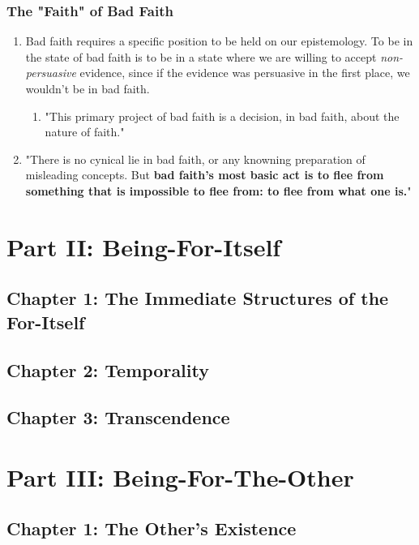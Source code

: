 \subsubsection{The "Faith" of Bad Faith}

\begin{enumerate}
  \item Bad faith requires a specific position to be held on our epistemology. To be in the state of bad faith is to be in a state where we are willing to accept \emph{non-persuasive} evidence, since if the evidence was persuasive in the first place, we wouldn't be in bad faith.
  \begin{enumerate}
    \item "This primary project of bad faith is a decision, in bad faith, about the nature of faith." \autocite[114]{sartre}
  \end{enumerate}
  \item "There is no cynical lie in bad faith, or any knowning preparation of misleading concepts. But \textbf{bad faith's most basic act is to flee from something that is impossible to flee from: to flee from what one is.}" \autocite[117]{sartre}
\end{enumerate}

\section{Part II: Being-For-Itself}

\subsection{Chapter 1: The Immediate Structures of the For-Itself}

\subsection{Chapter 2: Temporality}

\subsection{Chapter 3: Transcendence}

\section{Part III: Being-For-The-Other}

\subsection{Chapter 1: The Other's Existence}

